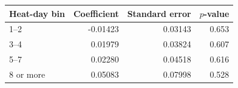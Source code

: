 \begin{tabular}{lrrr}
\toprule
Heat-day bin & Coefficient & Standard error & $p$-value \\
\midrule
1--2 & -0.01423 & 0.03143 & 0.653 \\
3--4 & 0.01979 & 0.03824 & 0.607 \\
5--7 & 0.02280 & 0.04518 & 0.616 \\
8 or more & 0.05083 & 0.07998 & 0.528 \\
\bottomrule
\end{tabular}
